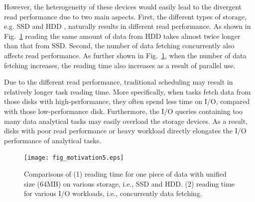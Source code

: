 \documentclass[conference]{IEEEtran}
\begin{document}
However, the heterogeneity of these devices would easily lead to the divergent read performance due to two main aspects. First, the different types of storage, e.g. SSD \cite{b32} and HDD \cite{b33}, naturally results in different read performance. As shown in Fig.~\ref{Fig:motivation} reading the same amount of data from HDD takes almost twice longer than that from SSD. Second, the number of data fetching concurrently also affects read performance. As further shown in Fig.~\ref{Fig:motivation}, when the number of data fetching increases, the reading time also increases as a result of parallel use.%

Due to the different read performance, traditional scheduling may result in relatively longer task reading time. More specifically, when tasks fetch data from those disks with high-performance, they often spend less time on I/O, compared with those low-performance disk. Furthermore, the I/O queries containing too many data analytical tasks may easily overload the storage devices. As a result, disks with poor read performance or heavy workload directly elongates the I/O performance of analytical tasks.

\begin{figure}[!t]
	\centering
	\texttt{[image: fig\_motivation5.eps]}
	\caption{Comparisons of (1) reading time for one piece of data with unified size (64MB) on various storage, i.e., SSD and HDD. (2) reading time for various I/O workloads, i.e., concurrently data fetching.}
	\label{Fig:motivation}

	\vspace{-0.4cm}
\end{figure} 

 
\end{document}
